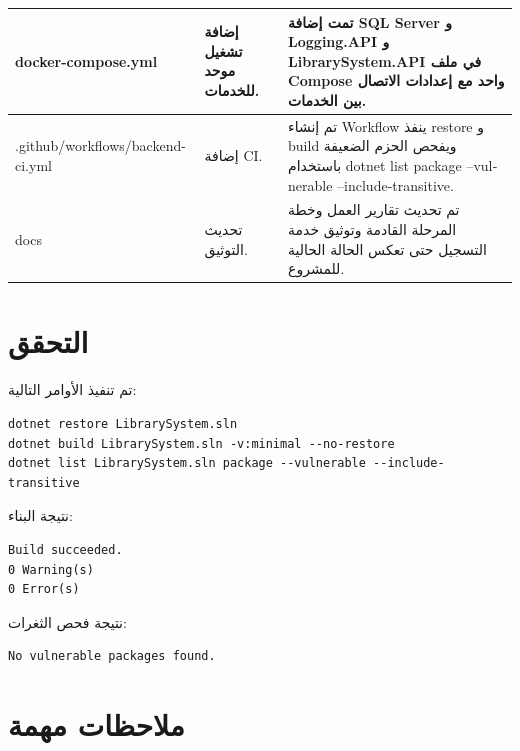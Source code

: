 \documentclass[12pt,a4paper]{article}
\begin{document}
\begin{longtable}{|p{4cm}|p{5.5cm}|p{5.5cm}|}
\textenglish{docker-compose.yml} &
إضافة تشغيل موحد للخدمات. &
تمت إضافة \textenglish{SQL Server} و \textenglish{Logging.API} و \textenglish{LibrarySystem.API} في ملف Compose واحد مع إعدادات الاتصال بين الخدمات. \\
\hline

\textenglish{.github/workflows/backend-ci.yml} &
إضافة CI. &
تم إنشاء Workflow ينفذ \textenglish{restore} و \textenglish{build} ويفحص الحزم الضعيفة باستخدام \textenglish{dotnet list package --vulnerable --include-transitive}. \\
\hline

\textenglish{docs} &
تحديث التوثيق. &
تم تحديث تقارير العمل وخطة المرحلة القادمة وتوثيق خدمة التسجيل حتى تعكس الحالة الحالية للمشروع. \\
\hline

\end{longtable}

\section{التحقق}

تم تنفيذ الأوامر التالية:

\begin{english}
\begin{verbatim}
dotnet restore LibrarySystem.sln
dotnet build LibrarySystem.sln -v:minimal --no-restore
dotnet list LibrarySystem.sln package --vulnerable --include-transitive
\end{verbatim}
\end{english}

نتيجة البناء:

\begin{english}
\begin{verbatim}
Build succeeded.
0 Warning(s)
0 Error(s)
\end{verbatim}
\end{english}

نتيجة فحص الثغرات:

\begin{english}
\begin{verbatim}
No vulnerable packages found.
\end{verbatim}
\end{english}

\section{ملاحظات مهمة}
\end{document}
